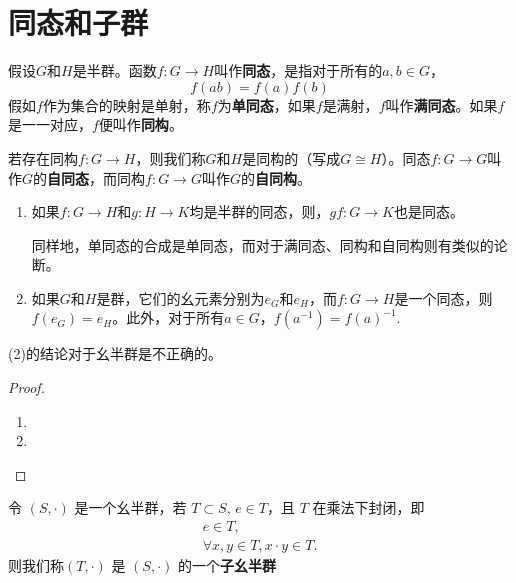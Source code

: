 \documentclass[../../main.tex]{subfiles}
\begin{document}
\section{同态和子群}

\begin{definition}[同态]
假设$G$和$H$是半群。函数$f: G \to H$叫作\textbf{同态}，是指对于所有的$a, b \in G$，
\[f(ab) = f(a)f(b)\]
假如$f$作为集合的映射是单射，称$f$为\textbf{单同态}，如果$f$是满射，$f$叫作\textbf{满同态}。如果$f$是一一对应，$f$便叫作\textbf{同构}。

若存在同构$f: G \to H$，则我们称$G$和$H$是同构的（写成$G \cong H$）。同态$f: G \to G$叫作$G$的\textbf{自同态}，而同构$f: G \to G$叫作$G$的\textbf{自同构}。
\end{definition}

\begin{theorem}
\begin{enumerate}[(1)]
\item 如果$f: G \to H$和$g: H \to K$均是半群的同态，则，$gf: G \to K$也是同态。

同样地，单同态的合成是单同态，而对于满同态、同构和自同构则有类似的论断。

\item 如果$G$和$H$是群，它们的幺元素分别为$e_G$和$e_H$，而$f: G \to H$是一个同态，则$f(e_G) = e_H$。此外，对于所有$a \in G$，$f(a^{-1}) = f(a)^{-1}$.
\end{enumerate}
\end{theorem}
\begin{remark}
(2)的结论对于幺半群是不正确的。
\end{remark}
\begin{proof}
\begin{enumerate}
\item 

\item 
\end{enumerate}

\end{proof}


\begin{definition}[子幺半群]
令 $(S, \cdot)$ 是一个幺半群，若 $T \subset S$, $e \in T$，且 $T$ 在乘法下封闭，即
\begin{gather*}
e \in T ,\\
\forall x, y \in T, x \cdot y\in T .
\end{gather*}
则我们称$(T, \cdot)$ 是 $(S, \cdot)$ 的一个\textbf{子幺半群}
\end{definition}
\end{document}
